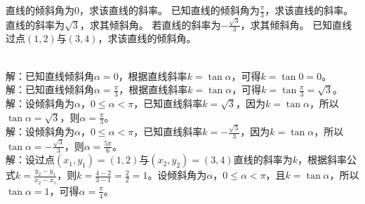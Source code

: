 \begin{Exercise}[title={倾斜角相关题目}, label={ex:inclination_angle_radian}] %
    \Question 直线的倾斜角为\(0\)，求该直线的斜率。
    \Question 已知直线的倾斜角为\(\frac{\pi}{3}\)，求该直线的斜率。
    \Question 直线的斜率为\(\sqrt{3}\)，求其倾斜角。
    \Question 若直线的斜率为\(-\frac{\sqrt{3}}{3}\)，求其倾斜角。
    \Question 已知直线过点\((1,2)\)与\((3,4)\)，求该直线的倾斜角。
\end{Exercise}
\begin{MyAnswer}[ref={ex:inclination_angle_radian}]
    \Question {}\\ 解：已知直线倾斜角\(\alpha = 0\)，根据直线斜率\(k = \tan\alpha\)，可得\(k=\tan0 = 0\)。
    \Question {}\\ 解：已知直线倾斜角\(\alpha=\frac{\pi}{3}\)，根据直线斜率\(k = \tan\alpha\)，可得\(k = \tan\frac{\pi}{3}=\sqrt{3}\)。
    \Question {}\\ 解：设倾斜角为\(\alpha\)，\(0\leq\alpha<\pi\)，已知直线斜率\(k = \sqrt{3}\)，因为\(k = \tan\alpha\)，所以\(\tan\alpha=\sqrt{3}\)，则\(\alpha=\frac{\pi}{3}\)。
    \Question {}\\ 解：设倾斜角为\(\alpha\)，\(0\leq\alpha<\pi\)，已知直线斜率\(k = -\frac{\sqrt{3}}{3}\)，因为\(k = \tan\alpha\)，所以\(\tan\alpha=-\frac{\sqrt{3}}{3}\)，则\(\alpha=\frac{5\pi}{6}\)。
    \Question {}\\ 解：设过点\((x_1,y_1)=(1,2)\)与\((x_2,y_2)=(3,4)\)直线的斜率为\(k\)，根据斜率公式\(k=\frac{y_2 - y_1}{x_2 - x_1}\)，则\(k=\frac{4 - 2}{3 - 1}=\frac{2}{2}=1\)。设倾斜角为\(\alpha\)，\(0\leq\alpha<\pi\)，且\(k = \tan\alpha\)，所以\(\tan\alpha = 1\)，可得\(\alpha=\frac{\pi}{4}\)。
\end{MyAnswer}












